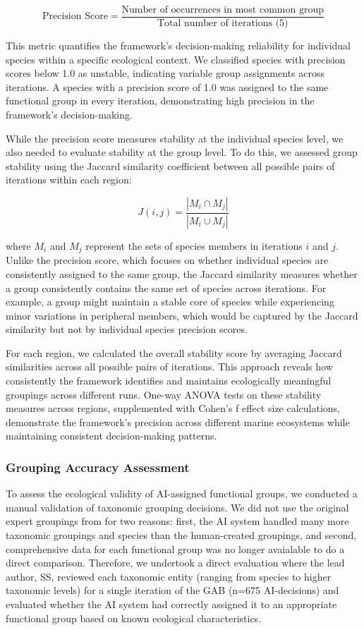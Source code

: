 \[
\text{Precision Score} = \frac{\text{Number of occurrences in most common group}}{\text{Total number of iterations (5)}}
\]

This metric quantifies the framework's decision-making reliability for individual species within a specific ecological context. We classified species with precision scores below 1.0 as unstable, indicating variable group assignments across iterations. A species with a precision score of 1.0 was assigned to the same functional group in every iteration, demonstrating high precision in the framework's decision-making.

While the precision score measures stability at the individual species level, we also needed to evaluate stability at the group level. To do this, we assessed group stability using the Jaccard similarity coefficient between all possible pairs of iterations within each region:

\[
J(i,j) = \frac{|M_{i} \cap M_{j}|}{|M_{i} \cup M_{j}|}
\]

where $M_{i}$ and $M_{j}$ represent the sets of species members in iterations $i$ and $j$. Unlike the precision score, which focuses on whether individual species are consistently assigned to the same group, the Jaccard similarity measures whether a group consistently contains the same set of species across iterations. For example, a group might maintain a stable core of species while experiencing minor variations in peripheral members, which would be captured by the Jaccard similarity but not by individual species precision scores.

For each region, we calculated the overall stability score by averaging Jaccard similarities across all possible pairs of iterations. This approach reveals how consistently the framework identifies and maintains ecologically meaningful groupings across different runs. One-way ANOVA tests on these stability measures across regions, supplemented with Cohen's f effect size calculations, demonstrate the framework's precision across different marine ecosystems while maintaining consistent decision-making patterns.

\subsubsection{Grouping Accuracy Assessment}
\label{sec:taxonomic_accuracy}
To assess the ecological validity of AI-assigned functional groups, we conducted a manual validation of taxonomic grouping decisions. We did not use the original expert groupings from \citep{Fulton2018} for two reasons: first, the AI system handled many more taxonomic groupings and species than the human-created groupings, and second, comprehensive data for each functional group was no longer avaialable to do a direct comparison. Therefore, we undertook a direct evaluation where the lead author, SS, reviewed each taxonomic entity (ranging from species to higher taxonomic levels) for a single iteration of the GAB (n=675 AI-decisions) and evaluated whether the AI system had correctly assigned it to an appropriate functional group based on known ecological characteristics.

